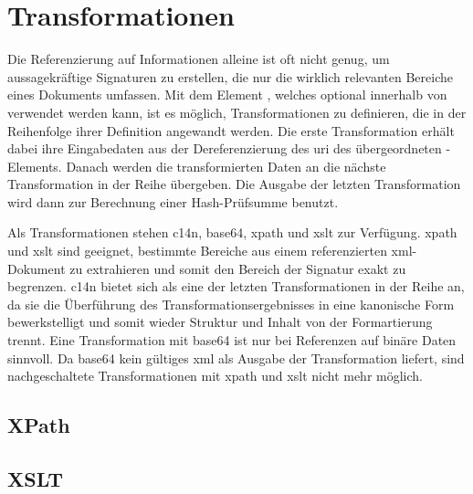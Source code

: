 \section{Transformationen}
\label{sec:XML-DSig:Transformationen}
Die Referenzierung auf Informationen alleine ist oft nicht genug, um aussagekräftige Signaturen zu erstellen, die nur die wirklich relevanten Bereiche eines
Dokuments umfassen. Mit dem Element , welches optional innerhalb von  verwendet werden kann, ist es möglich,
Transformationen zu definieren, die in der Reihenfolge ihrer Definition angewandt werden. Die erste Transformation erhält dabei ihre Eingabedaten aus der
Dereferenzierung des \gls{uri} des übergeordneten -Elements. Danach werden die transformierten Daten an die nächste Transformation in der
Reihe übergeben. Die Ausgabe der letzten Transformation wird dann zur Berechnung einer Hash-Prüfsumme benutzt.

Als Transformationen stehen \gls{c14n}, \gls{base64}, \gls{xpath} und \gls{xslt} zur Verfügung. \gls{xpath} und \gls{xslt} sind geeignet, bestimmte Bereiche aus
einem referenzierten \gls{xml}-Dokument zu extrahieren und somit den Bereich der Signatur exakt zu begrenzen. \gls{c14n} bietet sich als eine der letzten
Transformationen in der Reihe an, da sie die Überführung des Transformationsergebnisses in eine kanonische Form bewerkstelligt und somit wieder Struktur und
Inhalt von der Formartierung trennt. Eine Transformation mit \gls{base64} ist nur bei Referenzen auf binäre Daten sinnvoll. Da \gls{base64} kein gültiges
\gls{xml} als Ausgabe der Transformation liefert, sind nachgeschaltete Transformationen mit \gls{xpath} und \gls{xslt} nicht mehr möglich.

\subsection{XPath}
\label{sec:XML-DSig:Transformationen:XPath}

\subsection{XSLT}
\label{sec:XML-DSig:Transformationen:XSLT}

